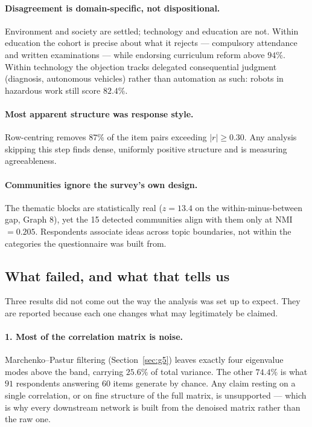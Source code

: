 \documentclass{article}
\begin{document}
\paragraph{Disagreement is domain-specific, not dispositional.}
Environment and society are settled; technology and education are not. Within
education the cohort is precise about what it rejects --- compulsory attendance
and written examinations --- while endorsing curriculum reform above $94\%$.
Within technology the objection tracks delegated consequential judgment
(diagnosis, autonomous vehicles) rather than automation as such: robots in
hazardous work still score $82.4\%$.

\paragraph{Most apparent structure was response style.}
Row-centring removes $87\%$ of the item pairs exceeding $|r|\geq0.30$. Any
analysis skipping this step finds dense, uniformly positive structure and is
measuring agreeableness.

\paragraph{Communities ignore the survey's own design.}
The thematic blocks are statistically real ($z=13.4$ on the
within-minus-between gap, Graph 8), yet the 15 detected communities align with
them only at NMI $=0.205$. Respondents associate ideas across topic boundaries,
not within the categories the questionnaire was built from.

\subsection{What failed, and what that tells us}
\label{sec:nulls}

Three results did not come out the way the analysis was set up to expect. They
are reported because each one changes what may legitimately be claimed.

\paragraph{1. Most of the correlation matrix is noise.}
Marchenko--Pastur filtering (Section~\ref{sec:g5}) leaves exactly four
eigenvalue modes above the band, carrying $25.6\%$ of total variance. The other
$74.4\%$ is what $91$ respondents answering $60$ items generate by chance. Any
claim resting on a single correlation, or on fine structure of the full matrix,
is unsupported --- which is why every downstream network is built from the
denoised matrix rather than the raw one.
\end{document}
